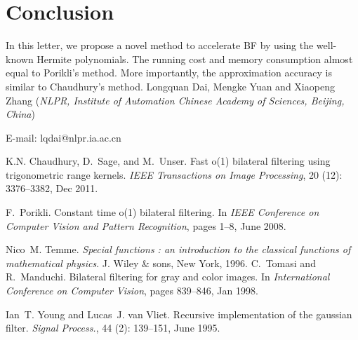 \documentclass[twocolumn]{el-author}
\begin{document}
\section{Conclusion }
In this letter, we propose a novel method to accelerate BF by using the well-known Hermite polynomials. The running cost and memory consumption almost equal to Porikli's method. More importantly, the approximation accuracy is similar to Chaudhury's method.
\vskip3pt
\vskip3pt
\noindent Longquan Dai, Mengke Yuan and Xiaopeng Zhang (\textit{NLPR, Institute of Automation Chinese Academy of Sciences, Beijing, China})
\vskip3pt

\noindent E-mail: lqdai@nlpr.ia.ac.cn

\begin{thebibliography}{}

K.N. Chaudhury, D.~Sage, and M.~Unser. Fast o(1) bilateral filtering using trigonometric range kernels. \emph{IEEE Transactions on Image Processing}, 20
  (12): 3376--3382, Dec 2011.

F.~Porikli. Constant time o(1) bilateral filtering. In \emph{IEEE Conference on Computer Vision and Pattern Recognition},
  pages 1--8, June 2008.

Nico~M. Temme. \emph{Special functions : an introduction to the classical functions
  of mathematical physics}. J. Wiley \& sons, New York, 1996.
C.~Tomasi and R.~Manduchi. Bilateral filtering for gray and color images. In \emph{International Conference on Computer Vision}, pages
  839--846, Jan 1998.

Ian~T. Young and Lucas~J. van Vliet. Recursive implementation of the gaussian filter. \emph{Signal Process.}, 44 (2): 139--151, June
  1995.

\end{thebibliography}
\end{document}
